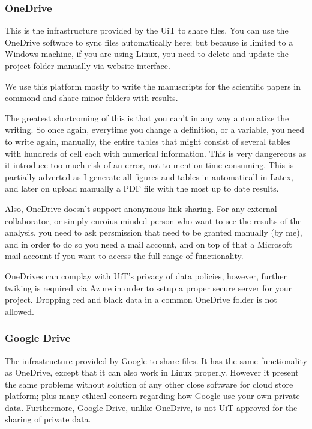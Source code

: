 \subsubsection{OneDrive}

This is the infrastructure provided by the UiT to share files. You can use the OneDrive software to sync files automatically here; but because is limited to a Windows machine, if you are using Linux, you need to delete and update the project folder manually via website interface.\vspace{3 mm}

We use this platform mostly to write the manuscripts for the scientific papers in commond and share minor folders with results.\vspace{3 mm}

The greatest shortcoming of this is that you can't in any way automatize the writing. So once again, everytime you change a definition, or a variable, you need to write again, manually, the entire tables that might consist of several tables with hundreds of cell each with numerical information. This is very dangereous as it introduce too much risk of an error, not to mention time consuming. This is partially adverted as I generate all figures and tables in automaticall in Latex, and later on upload manually a PDF file with the most up to date results.\vspace{3 mm}

Also, OneDrive doesn't support anonymous link sharing. For any external collaborator, or simply curoius minded person who want to see the results of the analysis, you need to ask persmission that need to be granted manually (by me), and in order to do so you need a mail account, and on top of that a Microsoft mail account if you want to access the full range of functionality.\vspace{3 mm}

OneDrives can complay with UiT's privacy of data policies, however, further twiking is required via Azure in order to setup a proper secure server for your project. Dropping red and black data in a common OneDrive folder is not allowed.\vspace{3 mm}

\subsubsection{Google Drive}

The infrastructure provided by Google to share files. It has the same functionality as OneDrive, except that it can also work in Linux properly. However it present the same problems without solution of any other close software for cloud store platform; plus many ethical concern regarding how Google use your own private data. Furthermore, Google Drive, unlike OneDrive, is not UiT approved for the sharing of private data.\vspace{3 mm}

